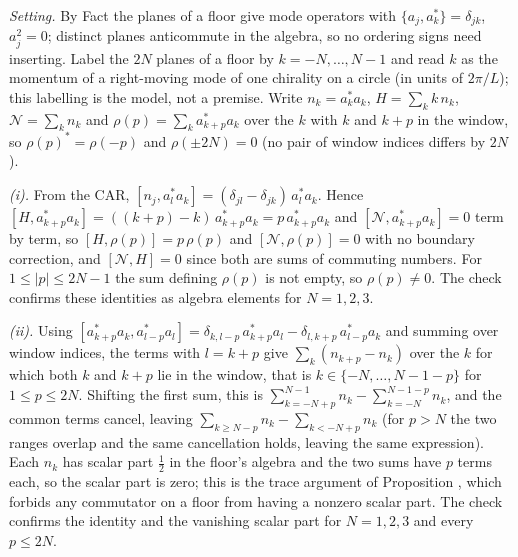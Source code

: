 \emph{Setting.} By Fact  the planes of a floor give mode operators with $\{a_j, a_k^{*}\} = \delta_{jk}$, $a_j^2 = 0$; distinct planes anticommute in the algebra, so no ordering signs need inserting. Label the $2N$ planes of a floor by $k = -N, \dots, N - 1$ and read $k$ as the momentum of a right-moving mode of one chirality on a circle (in units of $2\pi/L$); this labelling is the model, not a premise. Write $n_k = a_k^{*}a_k$, $H = \sum_k k\,n_k$, $\mathcal{N} = \sum_k n_k$ and $\rho(p) = \sum_k a_{k+p}^{*}a_k$ over the $k$ with $k$ and $k + p$ in the window, so $\rho(p)^{*} = \rho(-p)$ and $\rho(\pm 2N) = 0$ (no pair of window indices differs by $2N$).

\emph{(i).} From the CAR, $[n_j, a_{l}^{*}a_k] = (\delta_{jl} - \delta_{jk})\,a_l^{*}a_k$. Hence $[H, a_{k+p}^{*}a_k] = ((k + p) - k)\,a_{k+p}^{*}a_k = p\,a_{k+p}^{*}a_k$ and $[\mathcal{N}, a_{k+p}^{*}a_k] = 0$ term by term, so $[H, \rho(p)] = p\,\rho(p)$ and $[\mathcal{N}, \rho(p)] = 0$ with no boundary correction, and $[\mathcal{N}, H] = 0$ since both are sums of commuting numbers. For $1 \le |p| \le 2N - 1$ the sum defining $\rho(p)$ is not empty, so $\rho(p) \ne 0$. The check confirms these identities as algebra elements for $N = 1, 2, 3$.

\emph{(ii).} Using $[a_{k+p}^{*}a_k, a_{l-p}^{*}a_l] = \delta_{k,l-p}\,a_{k+p}^{*}a_l - \delta_{l,k+p}\,a_{l-p}^{*}a_k$ and summing over window indices, the terms with $l = k + p$ give $\sum_k (n_{k+p} - n_k)$ over the $k$ for which both $k$ and $k + p$ lie in the window, that is $k \in \{-N, \dots, N - 1 - p\}$ for $1 \le p \le 2N$. Shifting the first sum, this is $\sum_{k = -N + p}^{N - 1} n_k - \sum_{k = -N}^{N - 1 - p} n_k$, and the common terms cancel, leaving $\sum_{k \ge N - p} n_k - \sum_{k < -N + p} n_k$ (for $p > N$ the two ranges overlap and the same cancellation holds, leaving the same expression). Each $n_k$ has scalar part $\tfrac12$ in the floor's algebra and the two sums have $p$ terms each, so the scalar part is zero; this is the trace argument of Proposition , which forbids any commutator on a floor from having a nonzero scalar part. The check confirms the identity and the vanishing scalar part for $N = 1, 2, 3$ and every $p \le 2N$.

